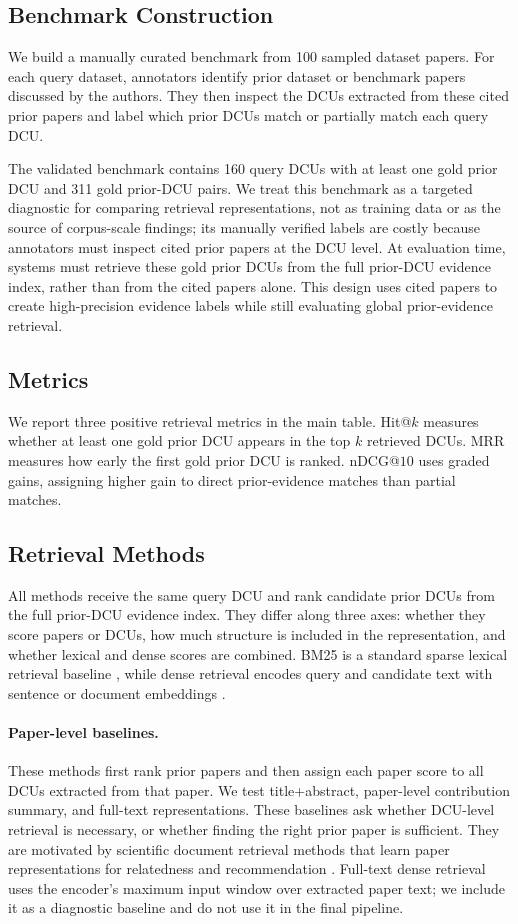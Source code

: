 \documentclass[11pt]{article}
\begin{document}
\subsection{Benchmark Construction}
We build a manually curated benchmark from 100 sampled dataset papers.
For each query dataset, annotators identify prior dataset or benchmark papers discussed by the authors.
They then inspect the DCUs extracted from these cited prior papers and label which prior DCUs match or partially match each query DCU.

The validated benchmark contains 160 query DCUs with at least one gold prior DCU and 311 gold prior-DCU pairs. 
We treat this benchmark as a targeted diagnostic for comparing retrieval representations, not as training data or as the source of corpus-scale findings; its manually verified labels are costly because annotators must inspect cited prior papers at the DCU level.
At evaluation time, systems must retrieve these gold prior DCUs from the full prior-DCU evidence index, rather than from the cited papers alone.
This design uses cited papers to create high-precision evidence labels while still evaluating global prior-evidence retrieval.
\subsection{Metrics}
We report three positive retrieval metrics in the main table.
Hit@$k$ measures whether at least one gold prior DCU appears in the top $k$ retrieved DCUs.
MRR measures how early the first gold prior DCU is ranked.
nDCG@$10$ uses graded gains, assigning higher gain to direct prior-evidence matches than partial matches.
\subsection{Retrieval Methods}
All methods receive the same query DCU and rank candidate prior DCUs from the full prior-DCU evidence index.
They differ along three axes: whether they score papers or DCUs, how much structure is included in the representation, and whether lexical and dense scores are combined.
BM25 is a standard sparse lexical retrieval baseline \citep{robertson2009probabilistic}, while dense retrieval encodes query and candidate text with sentence or document embeddings \citep{reimers2019sentence}.
\paragraph{Paper-level baselines.}
These methods first rank prior papers and then assign each paper score to all DCUs extracted from that paper.
We test title+abstract, paper-level contribution summary, and full-text representations.
These baselines ask whether DCU-level retrieval is necessary, or whether finding the right prior paper is sufficient.
They are motivated by scientific document retrieval methods that learn paper representations for relatedness and recommendation \citep{cohan2020specter,ostendorff2022scincl}.
Full-text dense retrieval uses the encoder's maximum input window over extracted paper text; we include it as a diagnostic baseline and do not use it in the final pipeline.
\end{document}
